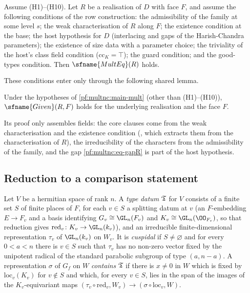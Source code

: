 \begin{theorem}\label{pf:multnc:main-mult}
Assume (H1)--(H10). Let $R$ be a realisation of $D$ with face $F$, and assume the following conditions of the row
construction: the admissibility of the family at some level $s$; the weak characterisation of $R$ along $F$; the
existence condition at the base; the host hypothesis for $D$ (interlacing and gaps of the Harish-Chandra parameters);
the existence of size data with a parameter choice; the triviality of the host's class field condition
($\mathrm{cc}_K=\top$); the guard condition; and the good-types condition. Then $\sfname{MultEq}(R)$ holds.
\end{theorem}

These conditions enter only through the following shared lemma.

\begin{lemma}\label{pf:multnc:given-of-top}
Under the hypotheses of \cref{pf:multnc:main-mult} (other than (H1)--(H10)), $\sfname{Given}(R,F)$ holds for the
underlying realisation and the face $F$.
\end{lemma}

Its proof only assembles fields: the core clauses come from the weak characterisation and the existence condition
(, which extracts them from the characterisation of $R$), the
irreducibility of the characters from the admissibility of the family, and the gap \eqref{pf:multnc:eq-gapR} is part of
the host hypothesis.

\subsection{Reduction to a comparison statement}\label{pf:multnc:sec-red}

\begin{definition}[Types]\label{pf:multnc:def-types}
Let $V$ be a hermitian space of rank $n$. A \emph{type datum} $\mathfrak{T}$ for $V$ consists of a finite set $S$ of finite
places of $F$, for each $v\in S$ a splitting datum at $v$ (an $F$-embedding $E\to F_v$ and a basis identifying
$G_v\cong\GL_n(F_v)$ and $K_v\cong\GL_n(\OO_{F_v})$, so that reduction gives $\mathrm{red}_v\colon K_v\to\GL_n(k_v)$),
and an irreducible finite-dimensional representation $\tau_v$ of $\GL_n(k_v)$ on $W_v$. It is \emph{cuspidal} if
$S\ne\varnothing$ and for every $0<a<n$ there is $v\in S$ such that $\tau_v$ has no non-zero vector fixed by the
unipotent radical of the standard parabolic subgroup of type $(a,n-a)$. A representation $\sigma$ of $G_f$ on $W$
\emph{contains} $\mathfrak{T}$ if there is $x\ne0$ in $W$ which is fixed by $\mathrm{loc}_v(K_v)$ for $v\notin S$ and which,
for every $v\in S$, lies in the span of the images of the $K_v$-equivariant maps
$(\tau_v\circ\mathrm{red}_v,W_v)\to(\sigma\circ\mathrm{loc}_v,W)$.
\end{definition}

